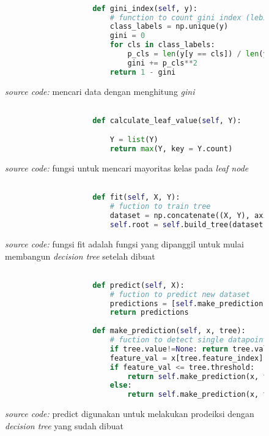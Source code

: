 		\begin{figure}[H]
			\begin{lstlisting}[language=Python, basicstyle=\tiny]

					def gini_index(self, y):
						# function to count gini index (lebih cepet aja karna gak pake log)
						class_labels = np.unique(y)
						gini = 0
						for cls in class_labels:
							p_cls = len(y[y == cls]) / len(y)
							gini += p_cls**2
						return 1 - gini

			\end{lstlisting}
			\caption{\emph{source code:} mencari data dengan menghitung \emph{gini}}
			\label{code: gini calculation function}
		\end{figure}

		\begin{figure}[H]
			\begin{lstlisting}[language=Python, basicstyle=\tiny]

					def calculate_leaf_value(self, Y):

						Y = list(Y)
						return max(Y, key = Y.count)

			\end{lstlisting}
			\caption{\emph{source code:} fungsi untuk mencari mayoritas 
			kelas pada \textit{leaf node}}
			\label{code: find majority class in node function}
		\end{figure}

		\begin{figure}[H]
			\begin{lstlisting}[language=Python, basicstyle=\tiny]

					def fit(self, X, Y):
						# fuction to train tree 
						dataset = np.concatenate((X, Y), axis = 1)
						self.root = self.build_tree(dataset)

			\end{lstlisting}
			\caption{\emph{source code:} fungsi fit adalah fungsi yang dipanggil untuk mulai membangun \emph{decision tree}
			setelah dibuat}
			\label{code: fit function}
		\end{figure}

		\begin{figure}[H]
			\begin{lstlisting}[language=Python, basicstyle=\tiny]

					def predict(self, X):
						# fuction to predict new dataset 
						predictions = [self.make_prediction(x, self.root) for x in X]
						return predictions
					
					def make_prediction(self, x, tree):
						# fuction to detect single datapoint
						if tree.value!=None: return tree.value
						feature_val = x[tree.feature_index]
						if feature_val <= tree.threshold:
							return self.make_prediction(x, tree.left)
						else:
							return self.make_prediction(x, tree.right)
			\end{lstlisting}
			\caption{\emph{source code:} predict digunakan untuk melakukan prodeiksi 
			dengan \emph{decision tree} yang sudah dibuat}
			\label{code: predict function}
		\end{figure}

\begin{comment}

\end{comment}
